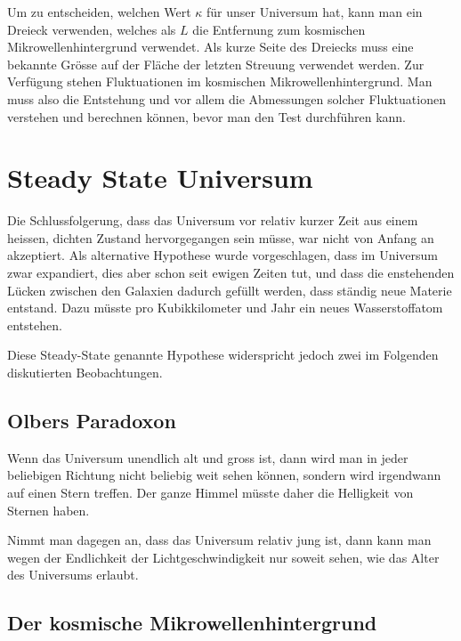 Um zu entscheiden, welchen Wert $\kappa$ für unser Universum hat,
kann man ein Dreieck verwenden, welches als $L$ die Entfernung zum kosmischen
Mikrowellenhintergrund verwendet.
Als kurze Seite des Dreiecks muss eine bekannte Grösse auf der
Fläche der letzten Streuung verwendet werden.
Zur Verfügung stehen Fluktuationen im kosmischen Mikrowellenhintergrund.
Man muss also die Entstehung und vor allem die Abmessungen solcher
Fluktuationen verstehen und berechnen können, bevor man den Test
durchführen kann.

\section{Steady State Universum}
Die Schlussfolgerung, dass das Universum vor relativ kurzer Zeit
aus einem heissen, dichten 
Zustand hervorgegangen sein müsse, war nicht von Anfang an akzeptiert.
Als alternative Hypothese wurde vorgeschlagen, dass im Universum 
zwar expandiert, dies aber schon seit ewigen Zeiten tut, und dass die
enstehenden
Lücken zwischen den Galaxien dadurch gefüllt werden, dass ständig
neue Materie entstand.
Dazu müsste pro Kubikkilometer und Jahr ein neues Wasserstoffatom
entstehen.

Diese Steady-State genannte Hypothese widerspricht jedoch zwei
im Folgenden diskutierten Beobachtungen.

\subsection{Olbers Paradoxon}
Wenn das Universum unendlich alt und gross ist, dann wird man in jeder
beliebigen Richtung nicht beliebig weit sehen können, sondern wird
irgendwann auf einen Stern treffen.
Der ganze Himmel müsste daher die Helligkeit von Sternen haben.

Nimmt man dagegen an, dass das Universum relativ jung ist, dann kann
man wegen der Endlichkeit der Lichtgeschwindigkeit nur soweit sehen,
wie das Alter des Universums erlaubt.

\subsection{Der kosmische Mikrowellenhintergrund}





